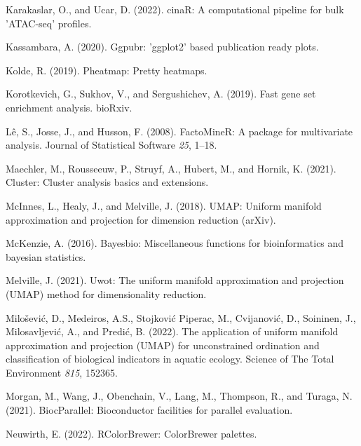 \documentclass[
  parskip,
  oneside]{scrreprt}
\newlength{\cslhangindent}
\newlength{\cslentryspacingunit} %
\newenvironment{CSLReferences}[2] %
 {%
  \setlength{\parindent}{0pt}
  \ifodd #1
  \let\oldpar\par
  \def\par{\hangindent=\cslhangindent\oldpar}
  \fi
  \setlength{\parskip}{#2\cslentryspacingunit}
 }%
 {}
\begin{document}
\begin{CSLReferences}{0}{0}
\leavevmode{}%
Karakaslar, O., and Ucar, D. (2022). cinaR: A computational pipeline for
bulk 'ATAC-seq' profiles.

\leavevmode{}%
Kassambara, A. (2020). Ggpubr: 'ggplot2' based publication ready plots.

\leavevmode{}%
Kolde, R. (2019). Pheatmap: Pretty heatmaps.

\leavevmode{}%
Korotkevich, G., Sukhov, V., and Sergushichev, A. (2019). Fast gene set
enrichment analysis. bioRxiv.

\leavevmode{}%
Lê, S., Josse, J., and Husson, F. (2008). {FactoMineR}: A package for
multivariate analysis. Journal of Statistical Software \emph{25}, 1--18.

\leavevmode{}%
Maechler, M., Rousseeuw, P., Struyf, A., Hubert, M., and Hornik, K.
(2021). Cluster: Cluster analysis basics and extensions.

\leavevmode{}%
McInnes, L., Healy, J., and Melville, J. (2018). UMAP: Uniform manifold
approximation and projection for dimension reduction (arXiv).

\leavevmode{}%
McKenzie, A. (2016). Bayesbio: Miscellaneous functions for
bioinformatics and bayesian statistics.

\leavevmode{}%
Melville, J. (2021). Uwot: The uniform manifold approximation and
projection (UMAP) method for dimensionality reduction.

\leavevmode{}%
Milošević, D., Medeiros, A.S., Stojković Piperac, M., Cvijanović, D.,
Soininen, J., Milosavljević, A., and Predić, B. (2022). The application
of uniform manifold approximation and projection (UMAP) for
unconstrained ordination and classification of biological indicators in
aquatic ecology. Science of The Total Environment \emph{815}, 152365.

\leavevmode{}%
Morgan, M., Wang, J., Obenchain, V., Lang, M., Thompson, R., and Turaga,
N. (2021). BiocParallel: Bioconductor facilities for parallel
evaluation.

\leavevmode{}%
Neuwirth, E. (2022). RColorBrewer: ColorBrewer palettes.


\end{CSLReferences}
\end{document}
